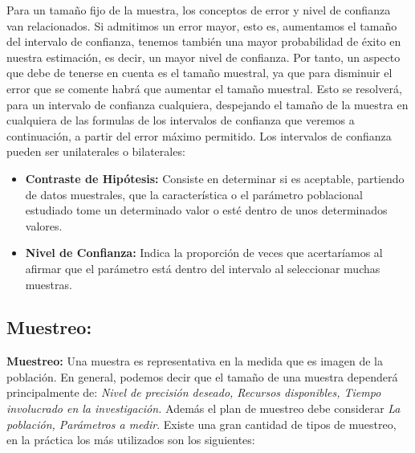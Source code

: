 \documentclass[a4paper]{report} %
\begin{document}
Para un tama\~no fijo de la muestra, los conceptos de error y nivel de confianza van relacionados. Si admitimos un error mayor, esto es, aumentamos el tama\~no del intervalo de confianza, tenemos tambi\'en una mayor probabilidad de \'exito en nuestra estimaci\'on, es decir, un mayor nivel de confianza. Por tanto, un aspecto que debe de tenerse en cuenta es el tama\~no muestral, ya que para disminuir el error que se comente habr\'a que aumentar el tama\~no muestral. Esto se resolver\'a, para un intervalo de confianza cualquiera, despejando el tama\~no de la muestra en cualquiera de las formulas de los intervalos de confianza que veremos a continuaci\'on, a partir del error m\'aximo permitido. Los intervalos de confianza pueden ser unilaterales o bilaterales:

\begin{itemize}
    \item \textbf{Contraste de Hip\'otesis:} Consiste en determinar si es aceptable, partiendo de datos muestrales, que la caracter\'istica o el par\'ametro poblacional estudiado tome un determinado valor o est\'e dentro de unos determinados valores.
    \item \textbf{Nivel de Confianza:} Indica la proporci\'on de veces que acertar\'iamos al afirmar que el par\'ametro est\'a dentro del intervalo al seleccionar muchas muestras.
\end{itemize}
\subsection{Muestreo:} 
\textbf{Muestreo:} Una muestra es representativa en la medida que es imagen de la poblaci\'on. En general, podemos decir que el tama\~no de una muestra depender\'a principalmente de: \textit{Nivel de precisi\'on deseado, Recursos disponibles, Tiempo involucrado en la investigaci\'on.} Adem\'as el plan de muestreo debe considerar \textit{La poblaci\'on, Par\'ametros a medir}. Existe una gran cantidad de tipos de muestreo, en la pr\'actica los m\'as utilizados son los siguientes:
\end{document}
